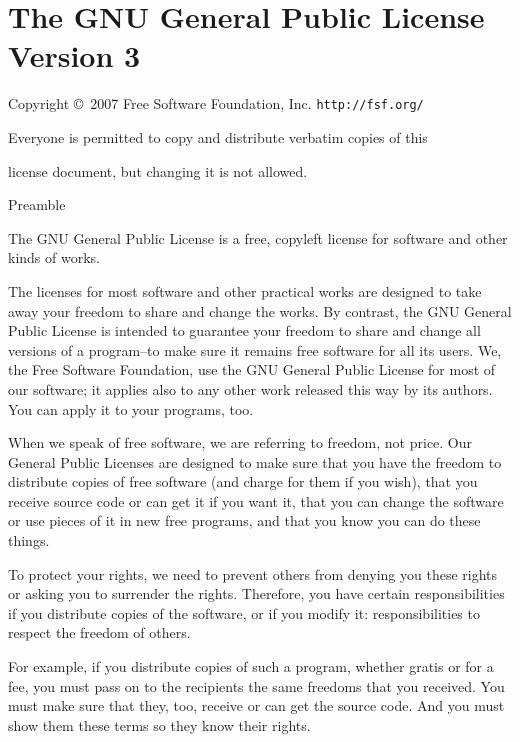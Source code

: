 \documentclass[11pt,a4paper]{refrep}
\begin{document}
\section*{The GNU General Public License Version 3}

\begin{fullpage}
\begin{center}
{\parindent 0in

Copyright \copyright\  2007 Free Software Foundation, Inc. \texttt{http://fsf.org/}

\bigskip
Everyone is permitted to copy and distribute verbatim copies of this

license document, but changing it is not allowed.}

\end{center}

\begin{center}
{\Large \sc Preamble}
\end{center}
The GNU General Public License is a free, copyleft license for
software and other kinds of works.

The licenses for most software and other practical works are designed
to take away your freedom to share and change the works.  By contrast,
the GNU General Public License is intended to guarantee your freedom to
share and change all versions of a program--to make sure it remains free
software for all its users.  We, the Free Software Foundation, use the
GNU General Public License for most of our software; it applies also to
any other work released this way by its authors.  You can apply it to
your programs, too.

When we speak of free software, we are referring to freedom, not
price.  Our General Public Licenses are designed to make sure that you
have the freedom to distribute copies of free software (and charge for
them if you wish), that you receive source code or can get it if you
want it, that you can change the software or use pieces of it in new
free programs, and that you know you can do these things.

To protect your rights, we need to prevent others from denying you
these rights or asking you to surrender the rights.  Therefore, you have
certain responsibilities if you distribute copies of the software, or if
you modify it: responsibilities to respect the freedom of others.

For example, if you distribute copies of such a program, whether
gratis or for a fee, you must pass on to the recipients the same
freedoms that you received.  You must make sure that they, too, receive
or can get the source code.  And you must show them these terms so they
know their rights.


\end{fullpage}
\end{document}
